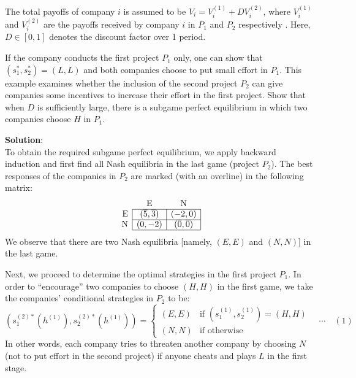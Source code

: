 \documentclass[twoside]{article}
\theoremstyle{definitionstyle}
\begin{document}
The total payoffs of company $i$ is assumed to be $V_i = V_i^{(1)} + D V_i^{(2)}$, where $V_i^{(1)}$ and $V_i^{(2)}$ are the payoffs received by company $i$ in $P_1$ and $P_2$ respectively . Here, $D \in [0,1]$ denotes the discount factor over 1 period.

If the company conducts the first project $P_1$ only, one can show that $(s_1^*, s_2^*) = (L, L)$ and both companies choose to put small effort in $P_1$. This example examines whether the inclusion of the second project $P_2$ can give companies some incentives to increase their effort in the first project.
Show that when $D$ is sufficiently large, there is a subgame perfect equilibrium in which two companies choose $H$ in $P_1$.

\textbf{Solution}:\\
To obtain the required subgame perfect equilibrium, we apply backward induction and first find all Nash equilibria in the last game (project $P_2$). The best responses of the companies in $P_2$ are marked (with an overline) in the following matrix:
\[
\begin{array}{r|c|c|}
\multicolumn{1}{r}{} & \multicolumn{1}{c}{\text{E}} & \multicolumn{1}{c}{\text{N}} \\ \cline{2-3}
\text{E} & (\overline{5}, \overline{3}) & (-2, 0) \\ \cline{2-3}
\text{N} & (0, -2) & (\overline{0}, \overline{0}) \\ \cline{2-3}
\end{array}
\]
We observe that there are two Nash equilibria [namely, $(E, E)$ and $(N, N)$] in the last game.

Next, we proceed to determine the optimal strategies in the first project $P_1$. In order to ``encourage'' two companies to choose $(H, H)$ in the first game, we take the companies' conditional strategies in $P_2$ to be:
\[
\left( s_1^{(2)*}(h^{(1)}), s_2^{(2)*}(h^{(1)}) \right) = 
\begin{cases} 
(E, E) & \text{if } (s_1^{(1)}, s_2^{(1)}) = (H, H) \\ 
(N, N) & \text{if otherwise} 
\end{cases} \quad \cdots \quad (1)
\]
In other words, each company tries to threaten another company by choosing $N$ (not to put effort in the second project) if anyone cheats and plays $L$ in the first stage.
\end{document}
